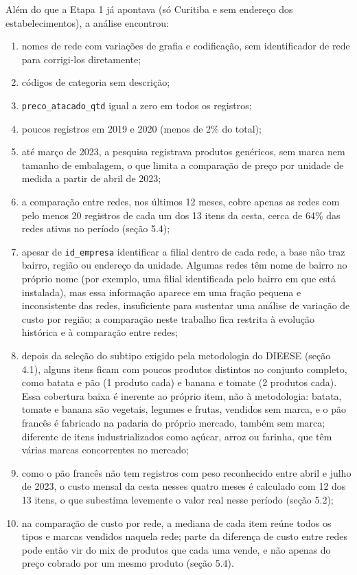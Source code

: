 \documentclass[11pt,a4paper]{article}
\newcommand{\col}[1]{\texttt{#1}}
\begin{document}
Além do que a Etapa 1 já apontava (só Curitiba e sem endereço dos estabelecimentos), a análise encontrou:

\begin{enumerate}[label=\alph*), itemsep=0pt, topsep=2pt]
  \item nomes de rede com variações de grafia e codificação, sem identificador de rede para corrigi-los diretamente;
  \item códigos de categoria sem descrição;
  \item \col{preco\_atacado\_qtd} igual a zero em todos os registros;
  \item poucos registros em 2019 e 2020 (menos de 2\% do total);
  \item até março de 2023, a pesquisa registrava produtos genéricos, sem marca nem tamanho de embalagem, o que limita a comparação de preço por unidade de medida a partir de abril de 2023;
  \item a comparação entre redes, nos últimos 12 meses, cobre apenas as redes com pelo menos 20 registros de cada um dos 13 itens da cesta, cerca de 64\% das redes ativas no período (seção 5.4);
  \item apesar de \col{id\_empresa} identificar a filial dentro de cada rede, a base não traz bairro, região ou endereço da unidade. Algumas redes têm nome de bairro no próprio nome (por exemplo, uma filial identificada pelo bairro em que está instalada), mas essa informação aparece em uma fração pequena e inconsistente das redes, insuficiente para sustentar uma análise de variação de custo por região; a comparação neste trabalho fica restrita à evolução histórica e à comparação entre redes;
  \item depois da seleção do subtipo exigido pela metodologia do DIEESE (seção 4.1), alguns itens ficam com poucos produtos distintos no conjunto completo, como batata e pão (1 produto cada) e banana e tomate (2 produtos cada). Essa cobertura baixa é inerente ao próprio item, não à metodologia: batata, tomate e banana são vegetais, legumes e frutas, vendidos sem marca, e o pão francês é fabricado na padaria do próprio mercado, também sem marca; diferente de itens industrializados como açúcar, arroz ou farinha, que têm várias marcas concorrentes no mercado;
  \item como o pão francês não tem registros com peso reconhecido entre abril e julho de 2023, o custo mensal da cesta nesses quatro meses é calculado com 12 dos 13 itens, o que subestima levemente o valor real nesse período (seção 5.2);
  \item na comparação de custo por rede, a mediana de cada item reúne todos os tipos e marcas vendidos naquela rede; parte da diferença de custo entre redes pode então vir do mix de produtos que cada uma vende, e não apenas do preço cobrado por um mesmo produto (seção 5.4).
\end{enumerate}
\end{document}
